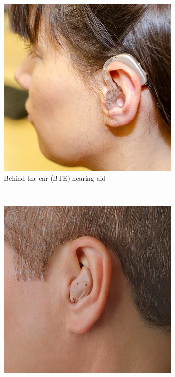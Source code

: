 \documentclass{l4proj}
\begin{document}
\begin{figure}
    \centering
    \begin{subfigure}[b]{0.2\textwidth}
        \includegraphics[width=\textwidth]{dissertation/images/BTE.png}
        \caption{Behind the ear (BTE) hearing aid}
        \label{fig:aid1}
    \end{subfigure}
    ~ %
    \begin{subfigure}[b]{0.2\textwidth}
        \includegraphics[width=\textwidth]{dissertation/images/ITE.png}

\end{subfigure}
\end{figure}
\end{document}
